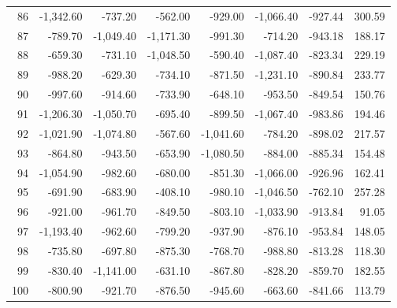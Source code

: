 \begin{longtable}{rrrrrrrr}
86 & -1,342.60 & -737.20 & -562.00 & -929.00 & -1,066.40 & -927.44 & 300.59  \\
87 & -789.70 & -1,049.40 & -1,171.30 & -991.30 & -714.20 & -943.18 & 188.17  \\
88 & -659.30 & -731.10 & -1,048.50 & -590.40 & -1,087.40 & -823.34 & 229.19  \\
89 & -988.20 & -629.30 & -734.10 & -871.50 & -1,231.10 & -890.84 & 233.77  \\
90 & -997.60 & -914.60 & -733.90 & -648.10 & -953.50 & -849.54 & 150.76  \\
91 & -1,206.30 & -1,050.70 & -695.40 & -899.50 & -1,067.40 & -983.86 & 194.46  \\
92 & -1,021.90 & -1,074.80 & -567.60 & -1,041.60 & -784.20 & -898.02 & 217.57  \\
93 & -864.80 & -943.50 & -653.90 & -1,080.50 & -884.00 & -885.34 & 154.48  \\
94 & -1,054.90 & -982.60 & -680.00 & -851.30 & -1,066.00 & -926.96 & 162.41  \\
95 & -691.90 & -683.90 & -408.10 & -980.10 & -1,046.50 & -762.10 & 257.28  \\
96 & -921.00 & -961.70 & -849.50 & -803.10 & -1,033.90 & -913.84 & 91.05  \\
97 & -1,193.40 & -962.60 & -799.20 & -937.90 & -876.10 & -953.84 & 148.05  \\
98 & -735.80 & -697.80 & -875.30 & -768.70 & -988.80 & -813.28 & 118.30  \\
99 & -830.40 & -1,141.00 & -631.10 & -867.80 & -828.20 & -859.70 & 182.55  \\
100 & -800.90 & -921.70 & -876.50 & -945.60 & -663.60 & -841.66 & 113.79  \\

\end{longtable}


